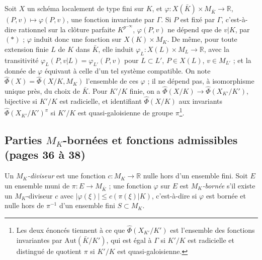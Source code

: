 \documentclass[11pt,a4paper]{article}
\begin{document}
Soit $X$ un schéma localement de type fini sur $K$, et
$\varphi : X(\bar K) \times M_{\bar K} \to \mathbb{R}$, $(P, v) \mapsto
\varphi(P, v)$, une fonction invariante par $\Gamma$. Si $P$ est fixé par
$\Gamma$, c'est-à-dire rationnel sur la clôture parfaite $K^{p^{-\infty}}$,
$\varphi(P, v)$ ne dépend que de $v|K$, par $(*)$ ; $\varphi$ induit donc
une fonction sur $X(K) \times M_K$. De même, pour toute extension finie $L$
de $K$ dans $\bar K$, elle induit $\varphi_L : X(L) \times M_L \to
\mathbb{R}$, avec la transitivité $\varphi_L(P, v|L) = \varphi_{L'}(P, v)$
pour $L \subset L'$, $P \in X(L)$, $v \in M_{L'}$ ; et la donnée de
$\varphi$ équivaut à celle d'un tel système compatible. On note
$\widehat\Phi(X) = \widehat\Phi(X/K, M_K)$ l'ensemble de ces $\varphi$ ; il
ne dépend pas, à isomorphisme unique près, du choix de $\bar K$. Pour $K'/K$
finie, on a $\widehat\Phi(X/K) \to \widehat\Phi(X_{K'}/K')$, bijective si
$K'/K$ est radicielle, et identifiant $\widehat\Phi(X/K)$ aux invariants
$\widehat\Phi(X_{K'}/K')^{\pi}$ si $K'/K$ est quasi-galoisienne de groupe
$\pi$\footnote{Les deux énoncés tiennent à ce que $\widehat\Phi(X_{K'}/K')$
est l'ensemble des fonctions invariantes par $\mathrm{Aut}(\bar K/K')$, qui
est égal à $\Gamma$ si $K'/K$ est radicielle et distingué de quotient $\pi$
si $K'/K$ est quasi-galoisienne.}.

\subsection*{Parties $M_K$-bornées et fonctions admissibles (pages 36 à 38)}

Un \emph{$M_K$-diviseur} est une fonction $c : M_K \to \mathbb{R}$ nulle
hors d'un ensemble fini. Soit $E$ un ensemble muni de $\pi : E \to
M_{\bar K}$ ; une fonction $\varphi$ sur $E$ est \emph{$M_K$-bornée} s'il
existe un $M_K$-diviseur $c$ avec $|\varphi(\xi)| \leqslant c(\pi(\xi)|K)$,
c'est-à-dire si $\varphi$ est bornée et nulle hors de $\pi^{-1}$ d'un
ensemble fini $S \subset M_K$.
\end{document}
